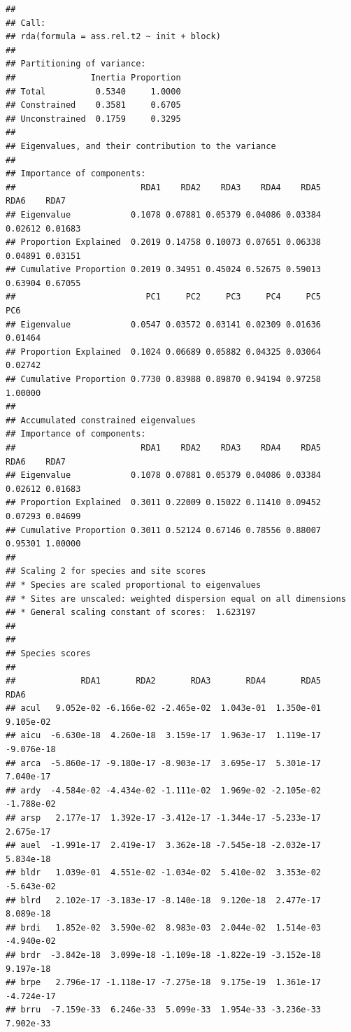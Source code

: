 \documentclass[
]{article}
\begin{document}
\begin{verbatim}
## 
## Call:
## rda(formula = ass.rel.t2 ~ init + block) 
## 
## Partitioning of variance:
##               Inertia Proportion
## Total          0.5340     1.0000
## Constrained    0.3581     0.6705
## Unconstrained  0.1759     0.3295
## 
## Eigenvalues, and their contribution to the variance 
## 
## Importance of components:
##                         RDA1    RDA2    RDA3    RDA4    RDA5    RDA6    RDA7
## Eigenvalue            0.1078 0.07881 0.05379 0.04086 0.03384 0.02612 0.01683
## Proportion Explained  0.2019 0.14758 0.10073 0.07651 0.06338 0.04891 0.03151
## Cumulative Proportion 0.2019 0.34951 0.45024 0.52675 0.59013 0.63904 0.67055
##                          PC1     PC2     PC3     PC4     PC5     PC6
## Eigenvalue            0.0547 0.03572 0.03141 0.02309 0.01636 0.01464
## Proportion Explained  0.1024 0.06689 0.05882 0.04325 0.03064 0.02742
## Cumulative Proportion 0.7730 0.83988 0.89870 0.94194 0.97258 1.00000
## 
## Accumulated constrained eigenvalues
## Importance of components:
##                         RDA1    RDA2    RDA3    RDA4    RDA5    RDA6    RDA7
## Eigenvalue            0.1078 0.07881 0.05379 0.04086 0.03384 0.02612 0.01683
## Proportion Explained  0.3011 0.22009 0.15022 0.11410 0.09452 0.07293 0.04699
## Cumulative Proportion 0.3011 0.52124 0.67146 0.78556 0.88007 0.95301 1.00000
## 
## Scaling 2 for species and site scores
## * Species are scaled proportional to eigenvalues
## * Sites are unscaled: weighted dispersion equal on all dimensions
## * General scaling constant of scores:  1.623197 
## 
## 
## Species scores
## 
##             RDA1       RDA2       RDA3       RDA4       RDA5       RDA6
## acul   9.052e-02 -6.166e-02 -2.465e-02  1.043e-01  1.350e-01  9.105e-02
## aicu  -6.630e-18  4.260e-18  3.159e-17  1.963e-17  1.119e-17 -9.076e-18
## arca  -5.860e-17 -9.180e-17 -8.903e-17  3.695e-17  5.301e-17  7.040e-17
## ardy  -4.584e-02 -4.434e-02 -1.111e-02  1.969e-02 -2.105e-02 -1.788e-02
## arsp   2.177e-17  1.392e-17 -3.412e-17 -1.344e-17 -5.233e-17  2.675e-17
## auel  -1.991e-17  2.419e-17  3.362e-18 -7.545e-18 -2.032e-17  5.834e-18
## bldr   1.039e-01  4.551e-02 -1.034e-02  5.410e-02  3.353e-02 -5.643e-02
## blrd   2.102e-17 -3.183e-17 -8.140e-18  9.120e-18  2.477e-17  8.089e-18
## brdi   1.852e-02  3.590e-02  8.983e-03  2.044e-02  1.514e-03 -4.940e-02
## brdr  -3.842e-18  3.099e-18 -1.109e-18 -1.822e-19 -3.152e-18  9.197e-18
## brpe   2.796e-17 -1.118e-17 -7.275e-18  9.175e-19  1.361e-17 -4.724e-17
## brru  -7.159e-33  6.246e-33  5.099e-33  1.954e-33 -3.236e-33  7.902e-33

\end{verbatim}
\end{document}
